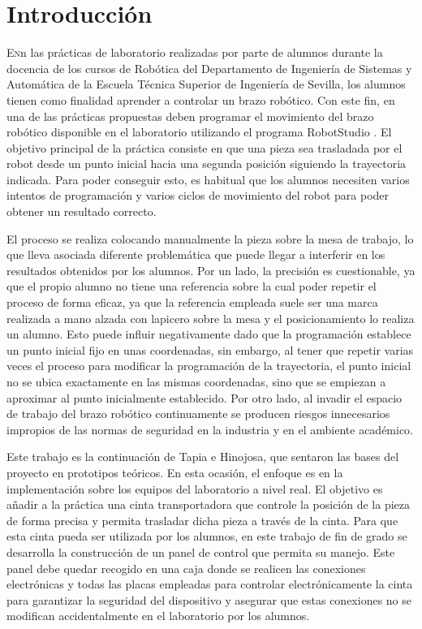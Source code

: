 \chapter{Introducción}\label{chp-01}


\lettrine[lraise=-0.1, lines=2, loversize=0.2]{E}{n}n las prácticas de laboratorio realizadas por parte de alumnos durante la docencia de los cursos de Robótica del Departamento de Ingeniería de Sistemas y Automática de la Escuela Técnica Superior de Ingeniería de Sevilla, los alumnos tienen como finalidad aprender a controlar un brazo robótico. Con este fin, en una de las prácticas propuestas deben programar el movimiento del brazo robótico disponible en el laboratorio utilizando el programa RobotStudio . El objetivo principal de la práctica consiste en que una pieza sea trasladada por el robot desde un punto inicial hacia una segunda posición siguiendo la trayectoria indicada. Para poder conseguir esto, es habitual que los alumnos necesiten varios intentos de programación y varios ciclos de movimiento del robot para poder obtener un resultado correcto.

El proceso se realiza colocando manualmente la pieza sobre la mesa de trabajo, lo que lleva asociada diferente problemática que puede llegar a interferir en los resultados obtenidos por los alumnos. Por un lado, la precisión es cuestionable, ya que el propio alumno no tiene una referencia sobre la cual poder repetir el proceso de forma eficaz, ya que la referencia empleada suele ser una marca realizada a mano alzada con lapicero sobre la mesa y el posicionamiento lo realiza un alumno. Esto puede influir negativamente dado que la programación establece un punto inicial fijo en unas coordenadas, sin embargo, al tener que repetir varias veces el proceso para modificar la programación de la trayectoria, el punto inicial no se ubica exactamente en las mismas coordenadas, sino que se empiezan a aproximar al punto inicialmente establecido. Por otro lado, al invadir el espacio de trabajo del brazo robótico continuamente se producen riesgos innecesarios impropios de las normas de seguridad en la industria y en el ambiente académico.

Este trabajo es la continuación de Tapia\cite{tapia} e Hinojosa\cite{rea}, que sentaron las bases del proyecto en prototipos teóricos. En esta ocasión, el enfoque es en la implementación sobre los equipos del laboratorio a nivel real. El objetivo es añadir a la práctica una cinta transportadora que controle la posición de la pieza de forma precisa y permita trasladar dicha pieza a través de la cinta. Para que esta cinta pueda ser utilizada por los alumnos, en este trabajo de fin de grado se desarrolla la construcción de un panel de control que permita su manejo. Este panel debe quedar recogido en una caja donde se realicen las conexiones electrónicas y todas las placas empleadas para controlar electrónicamente la cinta para garantizar la seguridad del dispositivo y asegurar que estas conexiones no se modifican accidentalmente en el laboratorio por los alumnos.

